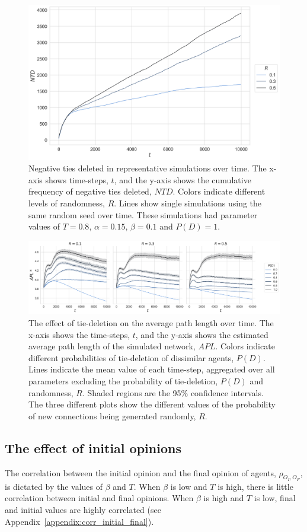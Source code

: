 \documentclass[11pt]{article}
\begin{document}
\begin{figure}[H]
    \centering
    \includegraphics[width=.7\linewidth]{../plots/example/Example_Negative_Ties_Deleted.png}
  \caption{Negative ties deleted in representative simulations over time. The x-axis shows time-steps, $t$, and the y-axis shows the cumulative frequency of negative ties deleted, $NTD$. Colors indicate different levels of randomness, $R$. Lines show single simulations using the same random seed over time. These simulations had parameter values of $T = 0.8$, $\alpha = 0.15$, $\beta = 0.1$ and $P(D)=1$.}
  \label{appendix:example_ntd}
\end{figure}

\begin{figure}[H]
    \centering
    \includegraphics[width=.98\linewidth]{../plots/overall/Average_Path_Length_Ties_Deleted.png}
  \caption{The effect of tie-deletion on the average path length over time. The x-axis shows the time-steps, $t$, and the y-axis shows the estimated average path length of the simulated network, $APL$. Colors indicate different probabilities of tie-deletion of dissimilar agents, $P(D)$. Lines indicate the mean value of each time-step, aggregated over all parameters excluding the probability of tie-deletion, $P(D)$ and randomness, $R$. Shaded regions are the 95\% confidence intervals. The three different plots show the different values of the probability of new connections being generated randomly, $R$. }
  \label{appendix:apl}
\end{figure}

\subsection{The effect of initial opinions}
The correlation between the initial opinion and the final opinion of agents, $\rho_{O_I, O_F}$, is dictated by the values of $\beta$ and $T$. When $\beta$ is low and $T$ is high, there is little correlation between initial and final opinions. When $\beta$ is high and $T$ is low, final and initial values are highly correlated (see Appendix~\ref{appendix:corr_initial_final}).
\end{document}
